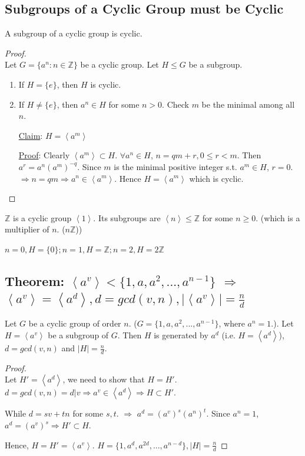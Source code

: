 \documentclass[11pt]{elegantbook}
\begin{document}
\subsection{Subgroups of a Cyclic Group must be Cyclic}
\begin{theorem}
A subgroup of a cyclic group is cyclic.
\end{theorem}
\begin{proof}
\quad\\
Let $G=\{a^n:n\in \mathbb{Z}\}$ be a cyclic group. Let $H\leq G$ be a subgroup.
\begin{enumerate}
    \item If $H=\{e\}$, then $H$ is cyclic.
    \item If $H\neq \{e\}$, then $a^n\in H$ for some $n>0$. Check $m$ be the minimal among all $n$.
    
    \underline{Claim}: $H=\left\langle a^m\right\rangle$

    \underline{Proof}: Clearly $\left\langle a^m\right\rangle\subset H$. $\forall a^n\in H$, $n=qm+r,0\leq r<m$. Then $a^r=a^n(a^m)^{-q}$. Since $m$ is the minimal positive integer s.t. $a^m\in H$, $r=0$. $\Rightarrow n=qm \Rightarrow a^n\in \left\langle a^m\right\rangle$. Hence $H=\left\langle a^m\right\rangle$ which is cyclic.
\end{enumerate}
\end{proof}
\begin{example}
\end{example}
$\mathbb{Z}$ is a cyclic group $\left\langle 1\right\rangle$. Its subgroups are $\left\langle n\right\rangle\leq \mathbb{Z}$ for some $n\geq 0$. (which is a multiplier of $n$. ($n \mathbb{Z}$))

$n=0,H=\{0\}; n=1,H=\mathbb{Z}; n=2,H=2 \mathbb{Z}$

\subsection{Theorem: $\left\langle a^v\right\rangle<\{1,a,a^2,...,a^{n-1}\}$ $\Rightarrow$ $\left\langle a^v\right\rangle=\left\langle a^d\right\rangle, d=gcd(v,n), |\left\langle a^v\right\rangle|=\frac{n}{d}$}
\begin{theorem}
    Let $G$ be a cyclic group of order $n$. ($G=\{1,a,a^2,...,a^{n-1}\}$, where $a^n=1$.). Let $H= \left\langle a^v\right\rangle$ be a subgroup of $G$. Then $H$ is generated by $a^d$ (i.e. $H=\left\langle a^d\right\rangle$), $d=gcd(v,n)$ and $|H|=\frac{n}{d}$.
\end{theorem}
\begin{proof}
\quad\\
Let $H'=\left\langle a^d\right\rangle$, we need to show that $H=H'$. $d=gcd(v,n)=d|v \Rightarrow a^v\in \left\langle a^d\right\rangle \Rightarrow H\subset H'$.

While $d=sv+tn$ for some $s,t$. $\Rightarrow$ $a^d=(a^v)^s(a^n)^t$. Since $a^n=1$, $a^d=(a^v)^s \Rightarrow	H'\subset H$.

Hence, $H=H'=\left\langle a^v\right\rangle$. $H=\{1,a^d,a^{2d},...,a^{n-d}\}, |H|=\frac{n}{d}$
\end{proof}
\end{document}

